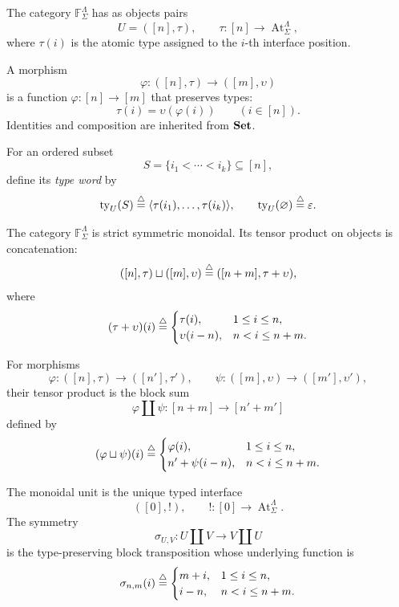 \begin{definition}
\label{def:lambda-typed-interfaces}
The category \(\mathbb F^{\Lambda}_{\Sigma}\) has as objects pairs
\[
  U=([n],\tau),
  \qquad
  \tau:[n]\longrightarrow
  \operatorname{At}^{\Lambda}_{\Sigma},
\]
where \(\tau(i)\) is the atomic type assigned to the \(i\)-th interface
position.

A morphism
\[
  \varphi:([n],\tau)\longrightarrow([m],\upsilon)
\]
is a function \(\varphi:[n]\to[m]\) that preserves types:
\[
  \tau(i)=\upsilon(\varphi(i))
  \qquad
  (i\in[n]).
\]
Identities and composition are inherited from \(\mathbf{Set}\).

For an ordered subset
\[
  S=\{i_1<\cdots<i_k\}\subseteq[n],
\]
define its \emph{type word} by
\[
  \operatorname{ty}_{U}(S)
  \stackrel{\triangle}{=}
  \langle\tau(i_1),\ldots,\tau(i_k)\rangle,
  \qquad
  \operatorname{ty}_{U}(\varnothing)\stackrel{\triangle}{=}\varepsilon.
\]

The category \(\mathbb F^{\Lambda}_{\Sigma}\) is strict symmetric
monoidal. Its tensor product on objects is concatenation:
\[
  ([n],\tau) \sqcup ([m],\upsilon)
  \stackrel{\triangle}{=}
  ([n+m],\tau + \upsilon),
\]
where
\[
  (\tau + \upsilon)(i)
  \stackrel{\triangle}{=}
  \begin{cases}
    \tau(i), & 1\leq i\leq n,\\
    \upsilon(i-n), & n<i\leq n+m.
  \end{cases}
\]

For morphisms
\[
  \varphi:([n],\tau)\to([n'],\tau'),
  \qquad
  \psi:([m],\upsilon)\to([m'],\upsilon'),
\]
their tensor product is the block sum
\[
  \varphi \coprod \psi:[n+m]\longrightarrow[n'+m']
\]
defined by
\[
  (\varphi \sqcup \psi)(i)
  \stackrel{\triangle}{=}
  \begin{cases}
    \varphi(i), & 1\leq i\leq n,\\
    n'+\psi(i-n), & n<i\leq n+m.
  \end{cases}
\]

The monoidal unit is the unique typed interface
\[
  ([0],!),
  \qquad
  !:[0]\longrightarrow\operatorname{At}^{\Lambda}_{\Sigma}.
\]
The symmetry
\[
  \sigma_{U,V}:U \coprod V\longrightarrow V \coprod U
\]
is the type-preserving block transposition whose underlying function is
\[
  \sigma_{n,m}(i)
  \stackrel{\triangle}{=}
  \begin{cases}
    m+i, & 1\leq i\leq n,\\
    i-n, & n<i\leq n+m.
  \end{cases}
\]
\end{definition}

